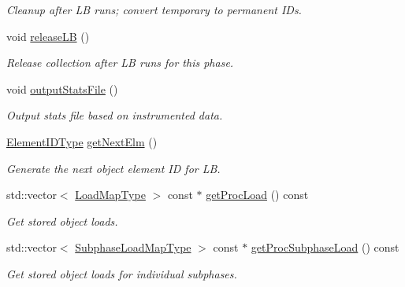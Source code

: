 \begin{DoxyCompactItemize}
\begin{DoxyCompactList}\small\item\em Cleanup after LB runs; convert temporary to permanent I\+Ds. \end{DoxyCompactList}\item 
void \hyperlink{structvt_1_1vrt_1_1collection_1_1balance_1_1_proc_stats_a7865efba4c984b1b77a93b5cd04dc861}{release\+LB} ()
\begin{DoxyCompactList}\small\item\em Release collection after LB runs for this phase. \end{DoxyCompactList}\item 
void \hyperlink{structvt_1_1vrt_1_1collection_1_1balance_1_1_proc_stats_a543211533c1c2c348137069e945432a5}{output\+Stats\+File} ()
\begin{DoxyCompactList}\small\item\em Output stats file based on instrumented data. \end{DoxyCompactList}\item 
\hyperlink{namespacevt_1_1vrt_1_1collection_1_1balance_a14c8d2c972f2913aa3f1636e5be0a120}{Element\+I\+D\+Type} \hyperlink{structvt_1_1vrt_1_1collection_1_1balance_1_1_proc_stats_aff0ecd6f0016ebd074b982caad107806}{get\+Next\+Elm} ()
\begin{DoxyCompactList}\small\item\em Generate the next object element ID for LB. \end{DoxyCompactList}\item 
std\+::vector$<$ \hyperlink{namespacevt_1_1vrt_1_1collection_1_1balance_a45306ee4bf38fe3fb586d1ee2fa3d147}{Load\+Map\+Type} $>$ const  $\ast$ \hyperlink{structvt_1_1vrt_1_1collection_1_1balance_1_1_proc_stats_a78e64d5f146db787d4bd0557b97c1d49}{get\+Proc\+Load} () const
\begin{DoxyCompactList}\small\item\em Get stored object loads. \end{DoxyCompactList}\item 
std\+::vector$<$ \hyperlink{namespacevt_1_1vrt_1_1collection_1_1balance_a3d91523158c1025b7b665240072f3b7e}{Subphase\+Load\+Map\+Type} $>$ const  $\ast$ \hyperlink{structvt_1_1vrt_1_1collection_1_1balance_1_1_proc_stats_a936e989f0d9ad9976374966738c82573}{get\+Proc\+Subphase\+Load} () const
\begin{DoxyCompactList}\small\item\em Get stored object loads for individual subphases. \end{DoxyCompactList}\item 

\end{DoxyCompactItemize}
